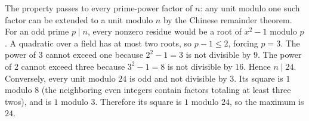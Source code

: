 The property passes to every prime-power factor of $n$: any unit modulo one such factor can be extended to a unit modulo $n$ by the Chinese remainder theorem. For an odd prime $p\mid n$, every nonzero residue would be a root of $x^2-1$ modulo $p$. A quadratic over a field has at most two roots, so $p-1\le2$, forcing $p=3$. The power of $3$ cannot exceed one because $2^2-1=3$ is not divisible by $9$. The power of $2$ cannot exceed three because $3^2-1=8$ is not divisible by $16$. Hence $n\mid24$. Conversely, every unit modulo $24$ is odd and not divisible by $3$. Its square is $1$ modulo $8$ (the neighboring even integers contain factors totaling at least three twos), and is $1$ modulo $3$. Therefore its square is $1$ modulo $24$, so the maximum is $\boxed{24}$.
